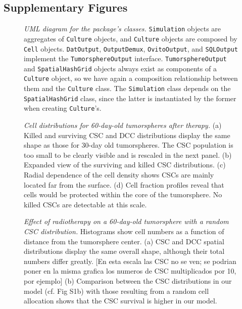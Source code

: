 \documentclass[10pt,letterpaper]{article}
\begin{document}
\subsection*{Supplementary Figures}

\begin{figure}
	\centering
	\caption{\emph{UML diagram for the package's classes.} \lstinline|Simulation| objects are aggregates of \lstinline|Culture| objects, and \lstinline|Culture| objects are composed by \lstinline|Cell| objects. \lstinline|DatOutput|, \lstinline|OutputDemux|, \lstinline|OvitoOutput|, and \lstinline|SQLOutput| implement the \lstinline|TumorsphereOutput| interface. \lstinline|TumorsphereOutput| and \lstinline|SpatialHashGrid| objects always exist as components of a \lstinline|Culture| object, so we have again a composition relationship between them and the \lstinline|Culture| class. The \lstinline|Simulation| class depends on the \lstinline|SpatialHashGrid| class, since the latter is instantiated by the former when creating \lstinline|Culture|'s. }
	\label{fig: uml_classes}
\end{figure}

\begin{figure}[ht]
	\centering
	\caption{\emph{Cell distributions for 60-day-old tumorspheres after therapy.}  (a) Killed and surviving CSC and DCC distributions display the same shape as those for 30-day old tumorspheres. The CSC population is too small to be clearly visible and is rescaled in the next panel. (b) Expanded view of the surviving and killed CSC distributions. (c) Radial dependence of the cell density shows CSCs are mainly located far from the surface. (d) Cell fraction profiles reveal that cells would be protected within the core of the tumorsphere.  No killed CSCs are detectable at this scale.}
	\label{fig:S1}
\end{figure}

\begin{figure}[ht]
	\centering
	\caption{\emph{Effect of radiotherapy on a 60-day-old tumorsphere with a random CSC distribution.} Histograms show cell numbers as a function of distance from the tumorsphere center. (a) CSC and DCC spatial distributions display the same overall shape, although their total numbers differ greatly. [En esta escala las CSC no se ven; se podrian poner en la misma grafica los numeros de CSC multiplicados por 10, por ejemplo] (b) Comparison between the CSC distributions in our model (cf. Fig S1b) with those resulting from a random cell allocation shows that the CSC survival is higher in our model.}
	\label{fig:S2}
\end{figure}
\end{document}
